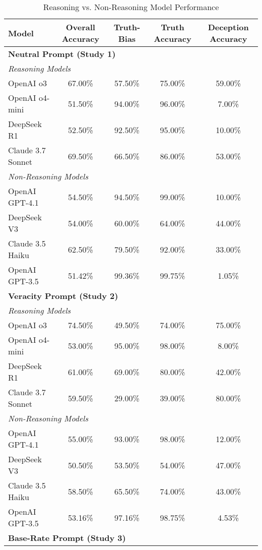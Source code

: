 \documentclass{article}
\begin{document}
\begin{table}[ht]
\centering
\caption{Reasoning vs. Non-Reasoning Model Performance}
\begin{tabular}{lcccc}
\toprule
\textbf{Model} & \textbf{Overall Accuracy} & \textbf{Truth-Bias} & \textbf{Truth Accuracy} & \textbf{Deception Accuracy} \\
\midrule
\multicolumn{5}{l}{\textbf{Neutral Prompt (Study 1)}} \\
\midrule
\multicolumn{5}{l}{\textit{Reasoning Models}} \\
OpenAI o3 & 67.00\% & 57.50\% & 75.00\% & 59.00\% \\
OpenAI o4-mini & 51.50\% & 94.00\% & 96.00\% & 7.00\% \\
DeepSeek R1 & 52.50\% & 92.50\% & 95.00\% & 10.00\% \\
Claude 3.7 Sonnet & 69.50\% & 66.50\% & 86.00\% & 53.00\% \\
\midrule
\multicolumn{5}{l}{\textit{Non-Reasoning Models}} \\
OpenAI GPT-4.1 & 54.50\% & 94.50\% & 99.00\% & 10.00\% \\
DeepSeek V3 & 54.00\% & 60.00\% & 64.00\% & 44.00\% \\
Claude 3.5 Haiku & 62.50\% & 79.50\% & 92.00\% & 33.00\% \\
OpenAI GPT-3.5 & 51.42\% & 99.36\% & 99.75\% & 1.05\% \\
\midrule
\multicolumn{5}{l}{\textbf{Veracity Prompt (Study 2)}} \\
\midrule
\multicolumn{5}{l}{\textit{Reasoning Models}} \\
OpenAI o3 & 74.50\% & 49.50\% & 74.00\% & 75.00\% \\
OpenAI o4-mini & 53.00\% & 95.00\% & 98.00\% & 8.00\% \\
DeepSeek R1 & 61.00\% & 69.00\% & 80.00\% & 42.00\% \\
Claude 3.7 Sonnet & 59.50\% & 29.00\% & 39.00\% & 80.00\% \\
\midrule
\multicolumn{5}{l}{\textit{Non-Reasoning Models}} \\
OpenAI GPT-4.1 & 55.00\% & 93.00\% & 98.00\% & 12.00\% \\
DeepSeek V3 & 50.50\% & 53.50\% & 54.00\% & 47.00\% \\
Claude 3.5 Haiku & 58.50\% & 65.50\% & 74.00\% & 43.00\% \\
OpenAI GPT-3.5 & 53.16\% & 97.16\% & 98.75\% & 4.53\% \\
\midrule
\multicolumn{5}{l}{\textbf{Base-Rate Prompt (Study 3)}} \\

\end{tabular}
\end{table}
\end{document}
